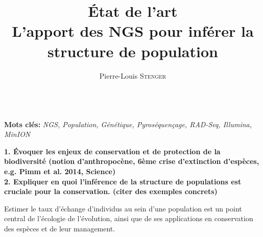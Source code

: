 \documentclass[a4paper,11pt,twoside]{report}
\title{{\Huge État de l'art}\\[3pc]L'apport des NGS pour inférer la structure de population}
\author{Pierre-Louis \textsc{Stenger}}
\date{}
\begin{document}
	
\onehalfspacing %



\frontmatter

\maketitle 

\listoffigures  %

\mainmatter





~~\\
\textbf{Mots clés:} \emph{NGS, Population, Génétique, Pyroséquençage, RAD-Seq, Illumina, MinION}
~~\\


\newpage

\textbf{1. Évoquer les enjeux de conservation et de protection de la biodiversité (notion d'anthropocène, 6ème crise d'extinction d'espèces, e.g. Pimm et al. 2014, Science)}
~~\\
\textbf{2. Expliquer en quoi l'inférence de la structure de populations est cruciale pour la conservation. (citer des exemples concrets)}

Estimer le taux d'échange d'individus au sein d'une population est un point central de l'écologie de l'évolution, ainsi que de ses applications en conservation des espèces et de leur management\citep{Gagnaire:2015aa}.
\end{document}
